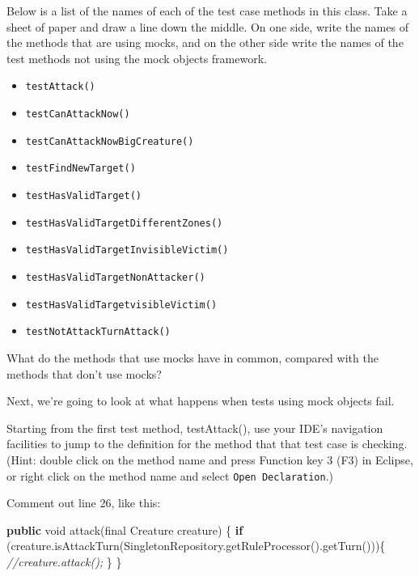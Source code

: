 \documentclass[
]{book}
\newenvironment{Shaded}{\begin{snugshade}}{\end{snugshade}}
\newcommand{\CommentTok}[1]{\textcolor[rgb]{0.56,0.35,0.01}{\textit{#1}}}
\newcommand{\DataTypeTok}[1]{\textcolor[rgb]{0.13,0.29,0.53}{#1}}
\newcommand{\FunctionTok}[1]{\textcolor[rgb]{0.00,0.00,0.00}{#1}}
\newcommand{\KeywordTok}[1]{\textcolor[rgb]{0.13,0.29,0.53}{\textbf{#1}}}
\newcommand{\NormalTok}[1]{#1}
\providecommand{\tightlist}{%
  \setlength{\itemsep}{0pt}\setlength{\parskip}{0pt}}
\begin{document}
Below is a list of the names of each of the test case methods in this class. Take a sheet of paper and draw a line down the middle. On one side, write the names of the methods that are using mocks, and on the other side write the names of the test methods not using the mock objects framework.

\begin{itemize}
\tightlist
\item
  \texttt{testAttack()}
\item
  \texttt{testCanAttackNow()}
\item
  \texttt{testCanAttackNowBigCreature()}
\item
  \texttt{testFindNewTarget()}
\item
  \texttt{testHasValidTarget()}
\item
  \texttt{testHasValidTargetDifferentZones()}
\item
  \texttt{testHasValidTargetInvisibleVictim()}
\item
  \texttt{testHasValidTargetNonAttacker()}
\item
  \texttt{testHasValidTargetvisibleVictim()}
\item
  \texttt{testNotAttackTurnAttack()}
\end{itemize}

What do the methods that use mocks have in common, compared with the methods that don't use mocks?

Next, we're going to look at what happens when tests using mock objects fail.

Starting from the first test method, testAttack(), use your IDE's navigation facilities to jump to the definition for the method that that test case is checking. (Hint: double click on the method name and press Function key 3 (F3) in Eclipse, or right click on the method name and select \texttt{Open\ Declaration}.)

Comment out line 26, like this:

\begin{Shaded}
\begin{Highlighting}[]
\KeywordTok{public} \DataTypeTok{void} \FunctionTok{attack}\NormalTok{(}\DataTypeTok{final}\NormalTok{ Creature creature) \{}
    \KeywordTok{if}\NormalTok{ (creature.}\FunctionTok{isAttackTurn}\NormalTok{(SingletonRepository.}\FunctionTok{getRuleProcessor}\NormalTok{().}\FunctionTok{getTurn}\NormalTok{()))\{}
        \CommentTok{//creature.attack();}
\NormalTok{    \}}
\NormalTok{\}}
\end{Highlighting}
\end{Shaded}
\end{document}

